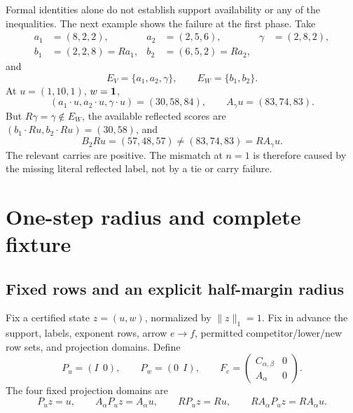 \documentclass[11pt]{article}
\theoremstyle{definition}
\theoremstyle{remark}
\begin{document}
Formal identities alone do not establish support availability or any of
the inequalities.  The next example shows the failure at the first phase.
Take
\[
\begin{aligned}
a_1&=(8,2,2),&a_2&=(2,5,6),&\gamma&=(2,8,2),\\
b_1&=(2,2,8)=Ra_1,&b_2&=(6,5,2)=Ra_2,
\end{aligned}
\tag{6.5}
\]
and
\[
 E_V=\{a_1,a_2,\gamma\},\qquad E_W=\{b_1,b_2\}.
\tag{6.6}
\]
At \(u=(1,10,1)\), \(w=\mathbf{1}\),
\[
 (a_1\cdot u,a_2\cdot u,\gamma\cdot u)=(30,58,84),
 \qquad A_\gamma u=(83,74,83).
\]
But \(R\gamma=\gamma\notin E_W\), the available reflected scores are
\((b_1\cdot Ru,b_2\cdot Ru)=(30,58)\), and
\[
 B_2Ru=(57,48,57)\neq(83,74,83)=RA_\gamma u.
\tag{6.7}
\]
The relevant carries are positive.  The mismatch at \(n=1\) is therefore
caused by the missing literal reflected label, not by a tie or carry
failure.

\section{One-step radius and complete fixture}

\subsection{Fixed rows and an explicit half-margin radius}

Fix a certified state \(z=(u,w)\), normalized by \(\|z\|_1=1\).  Fix in
advance the support, labels, exponent rows, arrow \(e\to f\), permitted
competitor/lower/new row sets, and projection domains.  Define
\[
 P_u=(I\ \ 0),\qquad P_w=(0\ \ I),\qquad
 F_e=\begin{pmatrix}C_{\alpha,\beta}&0\\A_\alpha&0\end{pmatrix}.
\tag{7.1}
\]
The four fixed projection domains are
\[
 P_uz=u,\qquad A_\alpha P_uz=A_\alpha u,\qquad
 RP_uz=Ru,\qquad RA_\alpha P_uz=RA_\alpha u.
\tag{7.2}
\]
\end{document}
